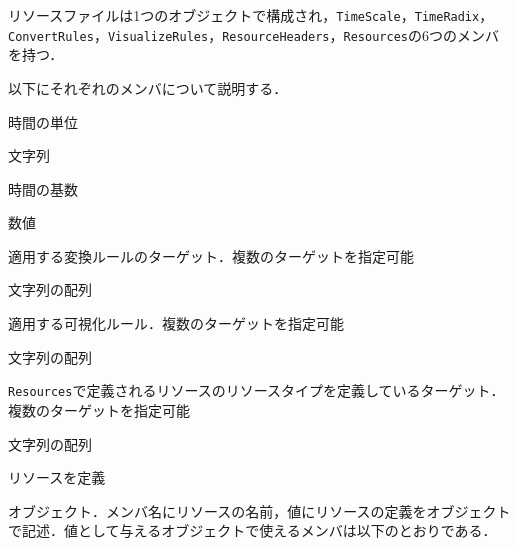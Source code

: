 リソースファイルは1つのオブジェクトで構成され，\verb|TimeScale|，\verb|TimeRadix|，\verb|ConvertRules|，\verb|VisualizeRules|，\verb|ResourceHeaders|，\verb|Resources|の6つのメンバを持つ．

以下にそれぞれのメンバについて説明する．

\begin{description}
{\nopagebreak
\item[\texttt{TimeScale}] \mbox{}
    \vspace{-1zw}
    \begin{description}
    \setlength{\itemsep}{-1.5\itemsep}
    \item[説明] 時間の単位
    \item[値] 文字列
    \end{description}
}{\nopagebreak
\item[\texttt{TimeRadix}] \mbox{}
    \vspace{-1zw}
    \begin{description}
    \setlength{\itemsep}{-1.5\itemsep}
    \item[説明] 時間の基数
    \item[値] 数値
    \end{description}
}{\nopagebreak
\item[\texttt{ConvertRules}] \mbox{}
    \vspace{-1zw}
    \begin{description}
    \setlength{\itemsep}{-1.5\itemsep}
    \item[説明] 適用する変換ルールのターゲット．複数のターゲットを指定可能
    \item[値] 文字列の配列
    \end{description}
}
\clearpage
{\nopagebreak
\item[\texttt{VisualizeRules}] \mbox{}
    \vspace{-1zw}
    \begin{description}
    \setlength{\itemsep}{-1.5\itemsep}
    \item[説明] 適用する可視化ルール．複数のターゲットを指定可能
    \item[値] 文字列の配列
    \end{description}
}{\nopagebreak
\item[\texttt{ResourceHeaders}] \mbox{}
    \vspace{-1zw}
    \begin{description}
    \setlength{\itemsep}{-1.5\itemsep}
    \item[説明] \verb|Resources|で定義されるリソースのリソースタイプを定義しているターゲット．複数のターゲットを指定可能
    \item[値] 文字列の配列
    \end{description}
}
\item[\texttt{Resources}] \mbox{}
    \vspace{-1zw}
    \begin{description}
    \setlength{\itemsep}{-1.5\itemsep}
    \item[説明] リソースを定義
    \item[値] オブジェクト．メンバ名にリソースの名前，値にリソースの定義をオブジェクトで記述．値として与えるオブジェクトで使えるメンバは以下のとおりである．
    

\end{description}
\end{description}
